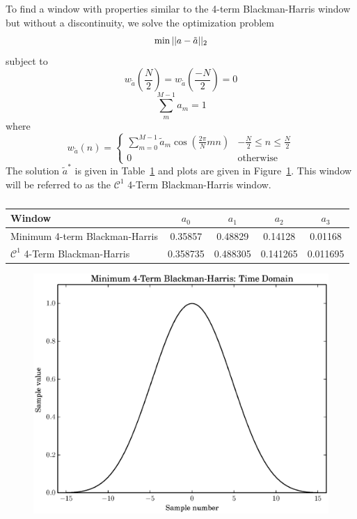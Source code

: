 \documentclass[letterpaper,12pt]{report}
\begin{document}
To find a window with properties similar to the 4-term Blackman-Harris window
but without a discontinuity, we solve the optimization problem
\[
        \min||a-\tilde{a}||_2 \\
\]
subject to
\[
        w_{\tilde{a}} \left( \frac{N}{2} \right)
            = w_{\tilde{a}} \left( \frac{-N}{2} \right) = 0
\]
\[
        \sum_{m}^{M-1} a_{m} = 1
\]
where
\[
    w_{\tilde{a}}(n) = \begin{cases}
        \sum_{m=0}^{M-1}\tilde{a}_{m}\cos \left( \frac{2\pi}{N}mn \right) & -\frac{N}{2} \leq n
        \leq \frac{N}{2} \\
        0 & \text{otherwise}
    \end{cases}
\]
The solution $\tilde{a}^{\ast}$ is given in Table~\ref{tab:opt_blackman} and
plots are given in Figure~\ref{plot:opt_blackman}. This window will be referred
to as the $\mathcal{C}^{1}$ 4-Term Blackman-Harris window.

\begin{table}
    \caption{\label{tab:opt_blackman}}
    \begin{center}
        \begin{tabular}{l c c c c }
            Window & $a_0$ & $a_1$ & $a_2$ & $a_3$ \\
            \hline
            Minimum 4-term Blackman-Harris & 0.35857 & 0.48829 & 0.14128 &
            0.01168 \\
            $\mathcal{C}^{1}$ 4-Term Blackman-Harris & 0.358735 & 0.488305 &
            0.141265 & 0.011695
        \end{tabular}
    \end{center}
\end{table}

\begin{figure}
    \caption{\label{plot:opt_blackman}}
    \includegraphics[width=\textwidth]{plots/min4_blackman_td.eps}
\end{figure}
\end{document}
